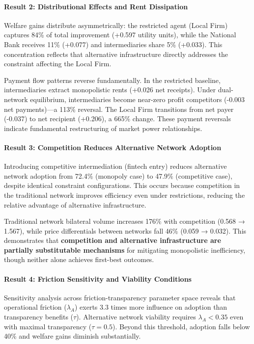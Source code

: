 \documentclass[12pt]{article}
\begin{document}
\paragraph{Result 2: Distributional Effects and Rent Dissipation}

Welfare gains distribute asymmetrically: the restricted agent (Local Firm) captures 84\% of total improvement (+0.597 utility units), while the National Bank receives 11\% (+0.077) and intermediaries share 5\% (+0.033). This concentration reflects that alternative infrastructure directly addresses the constraint affecting the Local Firm.

Payment flow patterns reverse fundamentally. In the restricted baseline, intermediaries extract monopolistic rents (+0.026 net receipts). Under dual-network equilibrium, intermediaries become near-zero profit competitors (-0.003 net payments)---a 113\% reversal. The Local Firm transitions from net payer (-0.037) to net recipient (+0.206), a 665\% change. These payment reversals indicate fundamental restructuring of market power relationships.

\paragraph{Result 3: Competition Reduces Alternative Network Adoption}

Introducing competitive intermediation (fintech entry) reduces alternative network adoption from 72.4\% (monopoly case) to 47.9\% (competitive case), despite identical constraint configurations. This occurs because competition in the traditional network improves efficiency even under restrictions, reducing the relative advantage of alternative infrastructure.

Traditional network bilateral volume increases 176\% with competition (0.568 → 1.567), while price differentials between networks fall 46\% (0.059 → 0.032). This demonstrates that \textbf{competition and alternative infrastructure are partially substitutable mechanisms} for mitigating monopolistic inefficiency, though neither alone achieves first-best outcomes.

\paragraph{Result 4: Friction Sensitivity and Viability Conditions}

Sensitivity analysis across friction-transparency parameter space reveals that operational friction ($\lambda_A$) exerts 3.3 times more influence on adoption than transparency benefits ($\tau$). Alternative network viability requires $\lambda_A < 0.35$ even with maximal transparency ($\tau = 0.5$). Beyond this threshold, adoption falls below 40\% and welfare gains diminish substantially.
\end{document}
